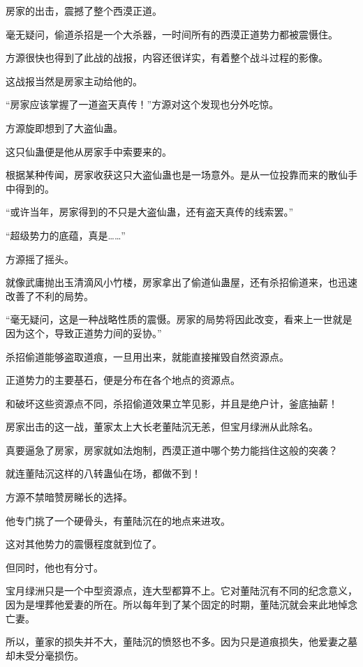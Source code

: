 
\begin{this_body}

房家的出击，震撼了整个西漠正道。

毫无疑问，偷道杀招是一个大杀器，一时间所有的西漠正道势力都被震慑住。

方源很快也得到了此战的战报，内容还很详实，有着整个战斗过程的影像。

这战报当然是房家主动给他的。

“房家应该掌握了一道盗天真传！”方源对这个发现也分外吃惊。

方源旋即想到了大盗仙蛊。

这只仙蛊便是他从房家手中索要来的。

根据某种传闻，房家收获这只大盗仙蛊也是一场意外。是从一位投靠而来的散仙手中得到的。

“或许当年，房家得到的不只是大盗仙蛊，还有盗天真传的线索罢。”

“超级势力的底蕴，真是……”

方源摇了摇头。

就像武庸抛出玉清滴风小竹楼，房家拿出了偷道仙蛊屋，还有杀招偷道来，也迅速改善了不利的局势。

“毫无疑问，这是一种战略性质的震慑。房家的局势将因此改变，看来上一世就是因为这个，导致正道势力间的妥协。”

杀招偷道能够盗取道痕，一旦用出来，就能直接摧毁自然资源点。

正道势力的主要基石，便是分布在各个地点的资源点。

和破坏这些资源点不同，杀招偷道效果立竿见影，并且是绝户计，釜底抽薪！

房家出击的这一战，董家太上大长老董陆沉无恙，但宝月绿洲从此除名。

真要逼急了房家，房家就如法炮制，西漠正道中哪个势力能挡住这般的突袭？

就连董陆沉这样的八转蛊仙在场，都做不到！

方源不禁暗赞房睇长的选择。

他专门挑了一个硬骨头，有董陆沉在的地点来进攻。

这对其他势力的震慑程度就到位了。

但同时，他也有分寸。

宝月绿洲只是一个中型资源点，连大型都算不上。它对董陆沉有不同的纪念意义，因为是埋葬他爱妻的所在。所以每年到了某个固定的时期，董陆沉就会来此地悼念亡妻。

所以，董家的损失并不大，董陆沉的愤怒也不多。因为只是道痕损失，他爱妻之墓却未受分毫损伤。


\end{this_body}
